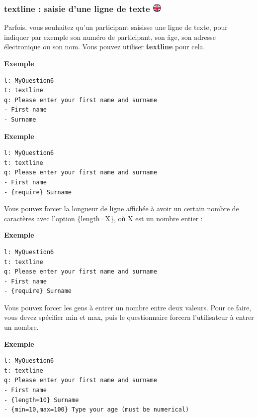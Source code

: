 \documentclass[
]{book}
\begin{document}
\hypertarget{textline-saisie-dune-ligne-de-texte-ukflag}{%
\subsubsection[textline : saisie d'une ligne de texte
]{\texorpdfstring{textline : saisie d'une ligne de texte
\href{https://www.psytoolkit.org/doc3.1.0/online-survey-syntax.html\#textline}{\protect\includegraphics{img/ukflag.png}}}{textline : saisie d'une ligne de texte ukflag}}\label{textline-saisie-dune-ligne-de-texte-ukflag}}

Parfois, vous souhaitez qu'un participant saisisse une ligne de texte,
pour indiquer par exemple son numéro de participant, son âge, son
adresse électronique ou son nom. Vous pouvez utiliser \textbf{textline}
pour cela.

\textbf{Exemple}

\begin{verbatim}
l: MyQuestion6
t: textline
q: Please enter your first name and surname
- First name
- Surname
\end{verbatim}

\textbf{Exemple}

\begin{verbatim}
l: MyQuestion6
t: textline
q: Please enter your first name and surname
- First name
- {require} Surname
\end{verbatim}

Vous pouvez forcer la longueur de ligne affichée à avoir un certain
nombre de caractères avec l'option \{length=X\}, où X est un nombre
entier :

\textbf{Exemple}

\begin{verbatim}
l: MyQuestion6
t: textline
q: Please enter your first name and surname
- First name
- {require} Surname
\end{verbatim}

Vous pouvez forcer les gens à entrer un nombre entre deux valeurs. Pour
ce faire, vous devez spécifier min et max, puis le questionnaire forcera
l'utilisateur à entrer un nombre.

\textbf{Exemple}

\begin{verbatim}
l: MyQuestion6
t: textline
q: Please enter your first name and surname
- First name
- {length=10} Surname
- {min=10,max=100} Type your age (must be numerical)
\end{verbatim}
\end{document}
